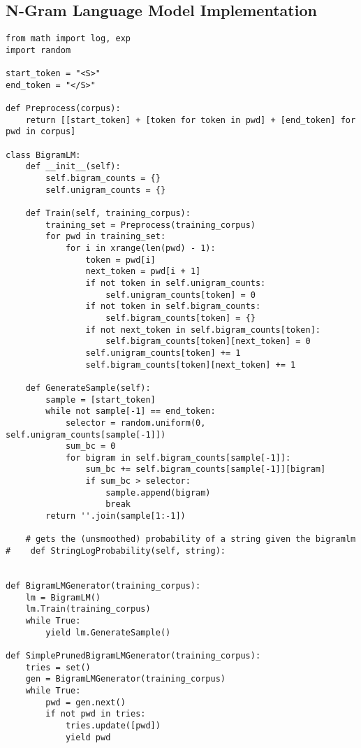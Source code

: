 \documentclass{amsart}
\theoremstyle{definition}
\theoremstyle{remark}
\numberwithin{equation}{section}
\begin{document}
\subsection{N-Gram Language Model Implementation}
\begin{lstlisting}
from math import log, exp
import random

start_token = "<S>"
end_token = "</S>"

def Preprocess(corpus):
    return [[start_token] + [token for token in pwd] + [end_token] for pwd in corpus]

class BigramLM:
    def __init__(self):
        self.bigram_counts = {}
        self.unigram_counts = {}

    def Train(self, training_corpus):
        training_set = Preprocess(training_corpus)
        for pwd in training_set:
            for i in xrange(len(pwd) - 1):
                token = pwd[i]
                next_token = pwd[i + 1]
                if not token in self.unigram_counts:
                    self.unigram_counts[token] = 0
                if not token in self.bigram_counts:
                    self.bigram_counts[token] = {}
                if not next_token in self.bigram_counts[token]:
                    self.bigram_counts[token][next_token] = 0
                self.unigram_counts[token] += 1
                self.bigram_counts[token][next_token] += 1

    def GenerateSample(self):
        sample = [start_token]
        while not sample[-1] == end_token:
            selector = random.uniform(0, self.unigram_counts[sample[-1]])
            sum_bc = 0
            for bigram in self.bigram_counts[sample[-1]]:
                sum_bc += self.bigram_counts[sample[-1]][bigram]
                if sum_bc > selector:
                    sample.append(bigram)
                    break
        return ''.join(sample[1:-1])

    # gets the (unsmoothed) probability of a string given the bigramlm
#    def StringLogProbability(self, string):


def BigramLMGenerator(training_corpus):
    lm = BigramLM()
    lm.Train(training_corpus)
    while True:
        yield lm.GenerateSample()

def SimplePrunedBigramLMGenerator(training_corpus):
    tries = set()
    gen = BigramLMGenerator(training_corpus)
    while True:
        pwd = gen.next()
        if not pwd in tries:
            tries.update([pwd])
            yield pwd
\end{lstlisting}
\end{document}
